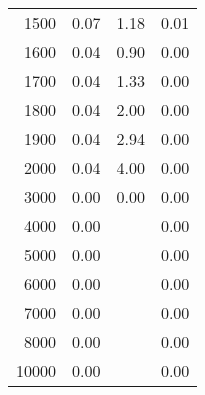 \begin{table}[ht]
\begin{tabular}{rrrr}
   1500 & 0.07 & 1.18 & 0.01 \\ 
   1600 & 0.04 & 0.90 & 0.00 \\ 
   1700 & 0.04 & 1.33 & 0.00 \\ 
   1800 & 0.04 & 2.00 & 0.00 \\ 
   1900 & 0.04 & 2.94 & 0.00 \\ 
   2000 & 0.04 & 4.00 & 0.00 \\ 
   3000 & 0.00 & 0.00 & 0.00 \\ 
   4000 & 0.00 &  & 0.00 \\ 
   5000 & 0.00 &  & 0.00 \\ 
   6000 & 0.00 &  & 0.00 \\ 
   7000 & 0.00 &  & 0.00 \\ 
   8000 & 0.00 &  & 0.00 \\ 
  10000 & 0.00 &  & 0.00 \\ 
   \hline
\end{tabular}
\end{table}

